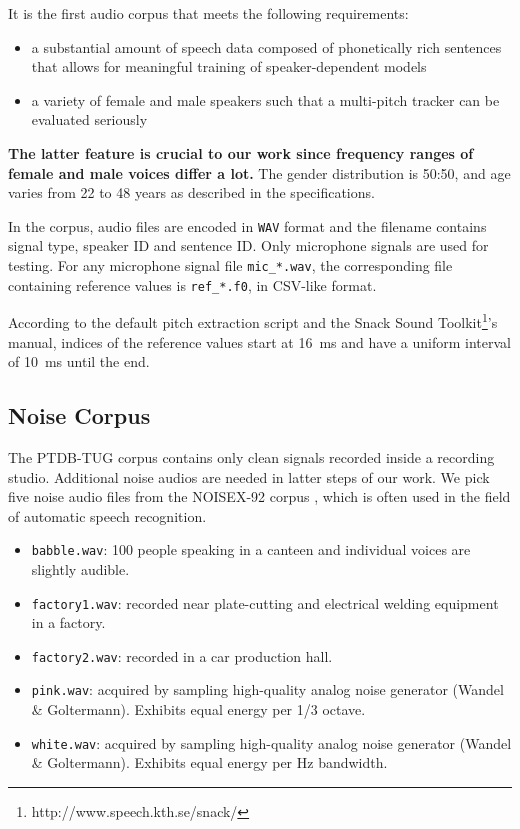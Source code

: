\documentclass[11pt,a4paper,titlepage]{article}
\begin{document}
It is the first audio corpus that meets the following requirements:

\begin{itemize}
  \item a substantial amount of speech data composed of phonetically rich sentences that allows for meaningful training of speaker-dependent models
  \item a variety of female and male speakers such that a multi-pitch tracker can be evaluated seriously
\end{itemize}

\textbf{The latter feature is crucial to our work since frequency ranges of female and male voices differ a lot.} The gender distribution is 50:50, and age varies from 22 to 48 years as described in the specifications.

\bigskip

In the corpus, audio files are encoded in \texttt{WAV} format and the filename contains signal type, speaker ID and sentence ID\@.
Only microphone signals are used for testing.
For any microphone signal file \texttt{mic\_*.wav}, the corresponding file containing reference values is \texttt{ref\_*.f0}, in CSV-like format.

According to the default pitch extraction script and the Snack Sound Toolkit\footnote{http://www.speech.kth.se/snack/}'s manual, indices of the reference values start at \SI{16}{\milli\second} and have a uniform interval of \SI{10}{\milli\second} until the end.

\subsection{Noise Corpus}

The PTDB-TUG corpus contains only clean signals recorded inside a recording studio.
Additional noise audios are needed in latter steps of our work.
We pick five noise audio files from the NOISEX-92 corpus \cite{varga1993assessment}, which is often used in the field of automatic speech recognition.

\begin{itemize}
  \item \texttt{babble.wav}: 100 people speaking in a canteen and individual voices are slightly audible.
  \item \texttt{factory1.wav}: recorded near plate-cutting and electrical welding equipment in a factory.
  \item \texttt{factory2.wav}: recorded in a car production hall.
  \item \texttt{pink.wav}: acquired by sampling high-quality analog noise generator (Wandel \& Goltermann).
    Exhibits equal energy per 1/3 octave.
  \item \texttt{white.wav}: acquired by sampling high-quality analog noise generator (Wandel \& Goltermann).
    Exhibits equal energy per \si{\hertz} bandwidth.
\end{itemize}
\end{document}

